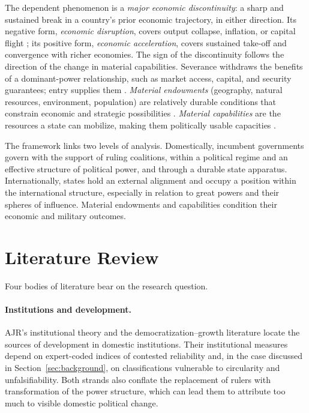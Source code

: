 \documentclass[11pt]{article}
\begin{document}
The dependent phenomenon is a \emph{major economic discontinuity}: a sharp and sustained break in a country's prior economic trajectory, in either direction. Its negative form, \emph{economic disruption}, covers output collapse, inflation, or capital flight \parencite{rodrik_1999}; its positive form, \emph{economic acceleration}, covers sustained take-off and convergence with richer economies. The sign of the discontinuity follows the direction of the change in material capabilities. Severance withdraws the benefits of a dominant-power relationship, such as market access, capital, and security guarantees; entry supplies them \parencite{lake_2009,gilpin_1981}. \emph{Material endowments} (geography, natural resources, environment, population) are relatively durable conditions that constrain economic and strategic possibilities \parencite{diamond_1997}. \emph{Material capabilities} are the resources a state can mobilize, making them politically usable capacities \parencite{mearsheimer_2001}.

The framework links two levels of analysis. Domestically, incumbent governments govern with the support of ruling coalitions, within a political regime and an effective structure of political power, and through a durable state apparatus. Internationally, states hold an external alignment and occupy a position within the international structure, especially in relation to great powers and their spheres of influence. Material endowments and capabilities condition their economic and military outcomes.

\section{Literature Review}
\label{sec:lit_review}

Four bodies of literature bear on the research question.

\paragraph{Institutions and development.} AJR's institutional theory \parencite{acemoglu_johnson_robinson_2001,acemoglu_johnson_robinson_2005,acemoglu_robinson_2012} and the democratization--growth literature \parencite{acemoglu_naidu_restrepo_robinson_2019} locate the sources of development in domestic institutions. Their institutional measures depend on expert-coded indices of contested reliability \parencite{treier_jackman_2008,little_meng_2024} and, in the case discussed in Section~\ref{sec:background}, on classifications vulnerable to circularity and unfalsifiability. Both strands also conflate the replacement of rulers with transformation of the power structure, which can lead them to attribute too much to visible domestic political change.
\end{document}

